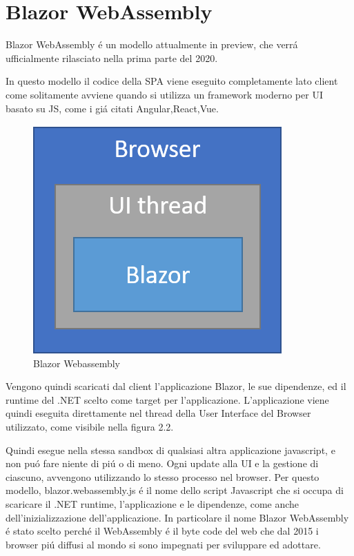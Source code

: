 \section{Blazor WebAssembly}\label{sez:bclient}
Blazor WebAssembly \'e un modello attualmente in preview, che verr\'a ufficialmente rilasciato nella prima parte del 2020.

In questo modello il codice della SPA viene eseguito completamente lato client come solitamente avviene quando si utilizza un framework moderno per UI basato su JS, come i gi\'a citati Angular,React,Vue.

\begin{figure}[H]
	\centerline{\includegraphics[scale=0.6]{figure/blazor-webassembly.png}}
	\caption{Blazor Webassembly}
	\label{fig:BlazorWebassembly}
\end{figure}

Vengono quindi scaricati dal client l'applicazione Blazor, le sue dipendenze, ed il runtime del .NET scelto come target per l'applicazione.
L'applicazione viene quindi eseguita direttamente nel thread della User Interface del Browser utilizzato, come visibile nella figura 2.2.

Quindi esegue nella stessa sandbox di qualsiasi altra applicazione javascript, e non pu\'o fare niente di pi\'u o di meno. Ogni update alla UI e la gestione di ciascuno, avvengono utilizzando lo stesso processo nel browser. Per questo modello, blazor.webassembly.js \'e il nome dello script Javascript che si occupa di scaricare il .NET runtime, l'applicazione e le dipendenze, come anche dell'inizializzazione dell'applicazione. 
In particolare il nome Blazor WebAssembly \'e stato scelto perch\'e il WebAssembly \'e il byte code del web che dal 2015 i browser pi\'u diffusi al mondo si sono impegnati per sviluppare ed adottare.
\pagebreak

